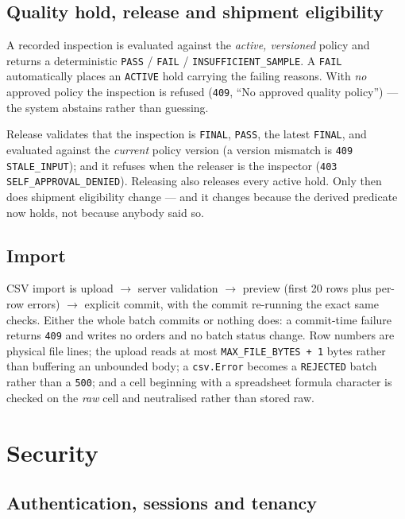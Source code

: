 \documentclass[11pt,a4paper]{article}
\begin{document}
\subsection{Quality hold, release and shipment eligibility}

A recorded inspection is evaluated against the \emph{active, versioned} policy
and returns a deterministic \texttt{PASS} / \texttt{FAIL} /
\texttt{INSUFFICIENT\_SAMPLE}. A \texttt{FAIL} automatically places an
\texttt{ACTIVE} hold carrying the failing reasons. With \emph{no} approved
policy the inspection is refused (\texttt{409}, ``No approved quality policy'')
--- the system abstains rather than guessing.

Release validates that the inspection is \texttt{FINAL}, \texttt{PASS}, the
latest \texttt{FINAL}, and evaluated against the \emph{current} policy version
(a version mismatch is \texttt{409 STALE\_INPUT}); and it refuses when the
releaser is the inspector (\texttt{403 SELF\_APPROVAL\_DENIED}). Releasing also
releases every active hold. Only then does shipment eligibility change --- and
it changes because the derived predicate now holds, not because anybody said so.

\subsection{Import}

CSV import is upload $\rightarrow$ server validation $\rightarrow$ preview
(first 20 rows plus per-row errors) $\rightarrow$ explicit commit, with the
commit re-running the exact same checks. Either the whole batch commits or
nothing does: a commit-time failure returns \texttt{409} and writes no orders
and no batch status change. Row numbers are physical file lines; the upload
reads at most \texttt{MAX\_FILE\_BYTES + 1} bytes rather than buffering an
unbounded body; a \texttt{csv.Error} becomes a \texttt{REJECTED} batch rather
than a \texttt{500}; and a cell beginning with a spreadsheet formula character
is checked on the \emph{raw} cell and neutralised rather than stored raw.

\section{Security}
\label{sec:security}

\subsection{Authentication, sessions and tenancy}
\end{document}
